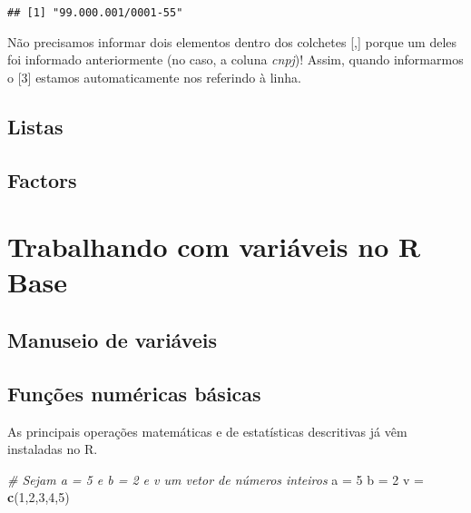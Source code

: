 \documentclass[
]{book}
\newenvironment{Shaded}{\begin{snugshade}}{\end{snugshade}}
\newcommand{\CommentTok}[1]{\textcolor[rgb]{0.56,0.35,0.01}{\textit{#1}}}
\newcommand{\DecValTok}[1]{\textcolor[rgb]{0.00,0.00,0.81}{#1}}
\newcommand{\KeywordTok}[1]{\textcolor[rgb]{0.13,0.29,0.53}{\textbf{#1}}}
\newcommand{\NormalTok}[1]{#1}
\newcommand{\StringTok}[1]{\textcolor[rgb]{0.31,0.60,0.02}{#1}}
\begin{document}
\begin{verbatim}
## [1] "99.000.001/0001-55"
\end{verbatim}

Não precisamos informar dois elementos dentro dos colchetes {[},{]} porque um deles foi informado anteriormente (no caso, a coluna \emph{cnpj})! Assim, quando informarmos o {[}3{]} estamos automaticamente nos referindo à linha.

\hypertarget{listas}{%
\section{Listas}\label{listas}}

\hypertarget{factors}{%
\section{Factors}\label{factors}}

\hypertarget{trabalhando-com-variuxe1veis-no-r-base}{%
\chapter{Trabalhando com variáveis no R Base}\label{trabalhando-com-variuxe1veis-no-r-base}}

\hypertarget{manuseio-de-variuxe1veis}{%
\section{Manuseio de variáveis}\label{manuseio-de-variuxe1veis}}

\hypertarget{funuxe7uxf5es-numuxe9ricas-buxe1sicas}{%
\section{Funções numéricas básicas}\label{funuxe7uxf5es-numuxe9ricas-buxe1sicas}}

As principais operações matemáticas e de estatísticas descritivas já vêm instaladas no R.

\begin{Shaded}
\begin{Highlighting}[]
\CommentTok{# Sejam a = 5 e b = 2 e v um vetor de números inteiros}
\NormalTok{a =}\StringTok{ }\DecValTok{5}
\NormalTok{b =}\StringTok{ }\DecValTok{2}
\NormalTok{v =}\StringTok{ }\KeywordTok{c}\NormalTok{(}\DecValTok{1}\NormalTok{,}\DecValTok{2}\NormalTok{,}\DecValTok{3}\NormalTok{,}\DecValTok{4}\NormalTok{,}\DecValTok{5}\NormalTok{)}
\end{Highlighting}
\end{Shaded}
\end{document}
